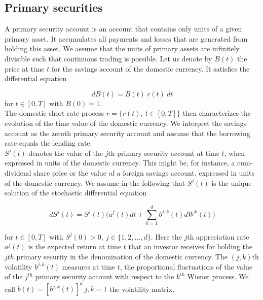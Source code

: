 \documentclass[a4 paper, 12pt]{report}
\theoremstyle{plain}
\begin{document}
\subsection{Primary securities}
A primary security account is an account that contains only
units of a given primary asset. It accumulates all payments and losses that are generated
from holding this asset. We assume that the units of primary assets are infinitely divisible
such that continuous trading is possible. Let us denote by $B(t)$ the price at time $t$ for the
savings account of the domestic currency. It satisfies the differential equation

\begin{equation}\label{2.1}
dB(t) = B(t) ~r(t) ~dt
\end{equation}
for $t\in [0,T]$ with $B(0) = 1.$\\

The domestic short rate process $r = \{r(t),~t\in [0,T]\}$ then characterizes the evolution of
the time value of the domestic currency. We interpret the savings account as the zeroth
primary security account and assume that the borrowing rate equals the lending rate.\\
$S^j(t)$ denotes the value of the $j$th primary security account at time $t$, when expressed in
units of the domestic currency. This might be, for instance, a cum-dividend share price or
the value of a foreign savings account, expressed in units of the domestic currency. We
assume in the following that $S^j(t)$ is the unique solution of the stochastic differential
equation

\begin{equation}\label{2.2}
dS^j(t) = S^j(t)\bigg(a^j(t)dt+\sum_{k = 1}^d b^{j,k}(t) dW^k(t)\bigg)
\end{equation}

for $t\in[0,T]$  with $S^j (0) > 0,~ j \in \{1, 2,\ldots,d\}$. Here the $j$th appreciation rate $a^j(t)$ is the
expected return at time $t$ that an investor receives for holding the $jth$ primary security in the denomination of the domestic currency. The $(j, k)$th volatility $b^{j,k}(t)$ measures at time $t$, the proportional fluctuations of the value of the $j^{th}$ primary security account with
respect to the $k^{th}$ Wiener process. We call $b(t) = [b^{j,k}(t)]^d~ j,k=1$ the volatility matrix.


\end{document}
